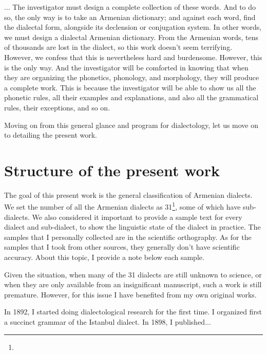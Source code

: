 ... The investigator must design a complete collection of these words. And to do so, the only way is to take an Armenian dictionary; and against each word, find the dialectal form, alongside its declension or conjugation system. In other words, we must design a dialectal Armenian dictionary. From the Armenian words, tens of thousands are lost in the dialect, so this work doesn't seem terrifying. However, we confess that this is nevertheless hard and burdensome. However, this is the only way. And the investigator will be comforted in knowing that when they are organizing the phonetics, phonology, and morphology, they will produce a complete work. This is because the investigator will be able to show us all the phonetic rules, all their examples and explanations, and also all the grammatical rules, their exceptions, and so on. 

Moving on from this general glance and program for dialectology, let us move on to detailing the present work. 

\section{Structure of the present work}

The goal of this present work is the general classification of Armenian dialects. We set the number of all the Armenian dialects as 31\footnote{}, some of which have sub-dialects. We also considered it important to provide a sample text for every dialect and sub-dialect, to show the linguistic state of the dialect in practice. The samples that I personally collected are in the scientific orthography. As for the samples that I took from other sources, they generally don't have scientific accuracy. About this topic, I provide a note below each sample. 

Given the situation, when many of the 31 dialects are still unknown to science, or when they are only available from an insignificant manuscript, such a work is still premature. However, for this issue I have benefited from my own original works. 

In 1892, I started doing dialectological research for the first time. I organized first a succinct grammar of the Istanbul dialect. In 1898, I published... 
\begin{adjarianpage}\label{page:13}\end{adjarianpage}%


